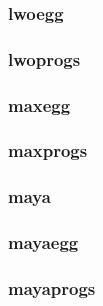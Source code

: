 \documentclass[a4paper]{article}
\begin{document}
\clearpage\subsubsection[lwoegg]{lwoegg}
\hypertarget{RefHeading23031167907073}{}\subsubsection{}
\clearpage\subsubsection[lwoprogs]{lwoprogs}
\hypertarget{RefHeading23051167907073}{}\subsubsection{}
\clearpage\subsubsection[maxegg]{maxegg}
\hypertarget{RefHeading23071167907073}{}\subsubsection{}
\clearpage\subsubsection[maxprogs]{maxprogs}
\hypertarget{RefHeading23091167907073}{}\subsubsection{}
\clearpage\subsubsection[maya]{maya}
\hypertarget{RefHeading23111167907073}{}\subsubsection{}
\clearpage\subsubsection[mayaegg]{mayaegg}
\hypertarget{RefHeading23131167907073}{}\subsubsection{}
\clearpage\subsubsection[mayaprogs]{mayaprogs}
\end{document}

